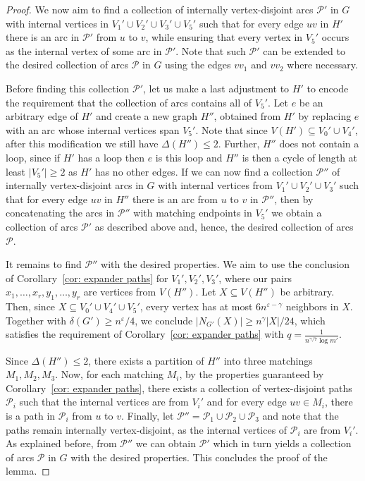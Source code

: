 \documentclass[11pt,reqno]{article}
\begin{document}
\begin{proof}
     We now aim to find a collection of internally vertex-disjoint arcs $\mathcal P'$ in $G$ with internal vertices in $V_1'\cup V_2' \cup V_3' \cup V_5'$ such that for every edge $uv$ in $H'$ there is an arc in $\mathcal P'$ from $u$ to $v$, while ensuring that every vertex in $V_5'$ occurs as the internal vertex of some arc in $\mathcal P'$. Note that such $\mathcal P'$ can be extended to the desired collection of arcs $\mathcal P$ in $G$ using the edges $vv_1$ and $vv_2$ where necessary.

     Before finding this collection $\mathcal{P}'$, let us make a last adjustment to $H'$ to encode the requirement that the collection of arcs contains all of $V_5'$. Let $e$ be an arbitrary edge of $H'$ and create a new graph $H''$, obtained from $H'$ by replacing $e$ with an arc whose internal vertices span $V_5'$. Note that since $V(H')\subseteq V_0'\cup V_4'$, after this modification we still have $\Delta(H'')\le 2$. 
      Further, $H''$ does not contain a loop, since if $H'$ has a loop then $e$ is this loop and $H''$ is then a cycle of length at least $|V_5'|\geq 2$ as $H'$ has no other edges. 
     If we can now find a collection $\mathcal P''$ of internally vertex-disjoint arcs in $G$ with internal vertices from $V_1'\cup V_2'\cup V_3'$ such that for every edge $uv$ in $H''$ there is an arc from $u$ to $v$ in $\mathcal P''$, then by concatenating the arcs in $\mathcal P''$ with matching endpoints in $V_5'$ we obtain a collection of arcs $\mathcal P'$ as described above and, hence, the desired collection of arcs $\mathcal P$.

     It remains to find $\mathcal{P}''$ with the desired properties. We aim to use the conclusion of Corollary~\ref{cor: expander paths} for $V_1',V_2',V_3'$, where our pairs $x_1,\ldots,x_r,y_1,\ldots,y_r$ are vertices from $V(H'')$. Let $X\subseteq V(H'')$ be arbitrary. Then, since $X\subseteq V_0'\cup V_4'\cup V_5'$, every vertex has at most $6n^{\varepsilon-\gamma}$ neighbors in $X$. Together with $\delta(G')\geq n^{\varepsilon}/4$, we conclude $|N_{G'}(X)|\geq n^{\gamma}|X|/24$, which satisfies the requirement of Corollary~\ref{cor: expander paths} with $q=\frac{1}{n^{\gamma/7}\log m'}$.

     Since $\Delta(H'')\leq 2$, there exists a partition of $H''$ into three matchings $M_1,M_2,M_3$. Now, for each matching $M_i$, by the properties guaranteed by Corollary~\ref{cor: expander paths}, there exists a collection of vertex-disjoint paths $\mathcal P_i$ such that the internal vertices are from $V_{i}'$ and for every edge $uv\in M_i$, there is a path in $\mathcal P_i$ from $u$ to $v$. Finally, let $\mathcal P''=\mathcal P_1\cup\mathcal P_2\cup\mathcal P_3$ and note that the paths remain internally vertex-disjoint, as the internal vertices of $\mathcal P_i$ are from $V_{i}'$. As explained before, from $\mathcal{P}''$ we can obtain $\mathcal{P}'$ which in turn yields a collection of arcs $\mathcal{P}$ in $G$ with the desired properties. This concludes the proof of the lemma.
\end{proof}
\end{document}
